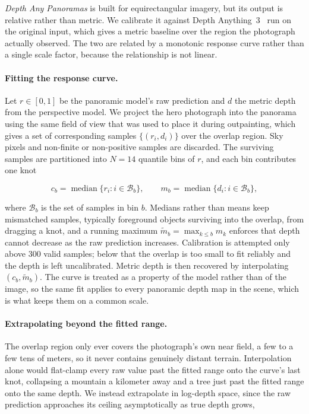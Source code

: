 \emph{Depth Any Panoramas} is built for equirectangular imagery, but its output is
relative rather than metric. We calibrate it against
Depth Anything~3~\cite{lin2025depth3recoveringvisual} run on the original input,
which gives a metric baseline over the region the photograph actually observed.
The two are related by a monotonic response curve rather than a single scale
factor, because the relationship is not linear.

\paragraph{Fitting the response curve.}
Let $r \in [0,1]$ be the panoramic model's raw prediction and $d$ the metric depth
from the perspective model. We project the hero photograph into the panorama using
the same field of view that was used to place it during outpainting, which gives a
set of corresponding samples $\{(r_i, d_i)\}$ over the overlap region. Sky pixels
and non-finite or non-positive samples are discarded. The surviving samples are
partitioned into $N = 14$ quantile bins of $r$, and each bin contributes one knot

\begin{equation}
  c_b = \operatorname{median}\{r_i : i \in \mathcal{B}_b\},
  \qquad
  m_b = \operatorname{median}\{d_i : i \in \mathcal{B}_b\},
\end{equation}

where $\mathcal{B}_b$ is the set of samples in bin $b$. Medians rather than means
keep mismatched samples, typically foreground objects surviving into the overlap,
from dragging a knot, and a running maximum $\tilde{m}_b = \max_{k \le b} m_k$
enforces that depth cannot decrease as the raw prediction increases. Calibration is
attempted only above $300$ valid samples; below that the overlap is too small to fit
reliably and the depth is left uncalibrated. Metric depth is then recovered by
interpolating $(c_b, \tilde{m}_b)$. The curve is treated as a property of the model
rather than of the image, so the same fit applies to every panoramic depth map in
the scene, which is what keeps them on a common scale.

\paragraph{Extrapolating beyond the fitted range.}
The overlap region only ever covers the photograph's own near field, a few to a few
tens of meters, so it never contains genuinely distant terrain. Interpolation alone
would flat-clamp every raw value past the fitted range onto the curve's last knot,
collapsing a mountain a kilometer away and a tree just past the fitted range onto
the same depth. We instead extrapolate in log-depth space, since the raw prediction
approaches its ceiling asymptotically as true depth grows,

